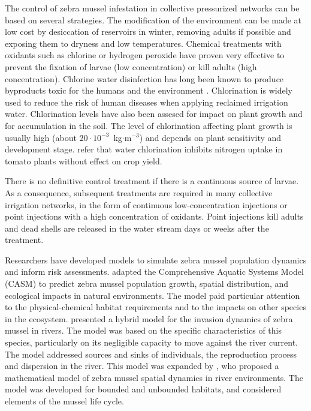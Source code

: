 \documentclass[review,authoryear]{elsarticle}
\begin{document}
The control of zebra mussel infestation in collective pressurized networks can
be based on several strategies. The modification of the environment can be made
at low cost by desiccation of reservoirs in winter, removing adults if possible
and exposing them to dryness and low temperatures. Chemical treatments with
oxidants such as chlorine or hydrogen peroxide have proven very effective to
prevent the fixation of larvae (low concentration) or kill adults (high
concentration). Chlorine water disinfection has long been known to produce
byproducts toxic for the humans and the environment \citep{Hanigan17}.
Chlorination is widely used to reduce the risk of human diseases when applying
reclaimed irrigation water. Chlorination levels have also been assesed for
impact on plant growth and for accumulation in the soil. The level of
chlorination affecting plant growth is usually high (about
$20\cdot10^{-3}$~kg$\cdot$m$^{-3}$) and depends on plant sensitivity and
development stage. \citet{LiLi09} refer that water chlorination inhibits
nitrogen uptake in tomato plants without effect on crop yield.

There is no definitive control treatment if there is a continuous source of
larvae. As a consequence, subsequent treatments are required in many collective
irrigation networks, in the form of continuous low-concentration injections or
point injections with a high concentration of oxidants. Point injections kill
adults and dead shells are released in the water stream days or weeks after the
treatment.

Researchers have developed models to simulate zebra mussel population dynamics
and inform risk assessments. \citet{Wu10} adapted the Comprehensive Aquatic
Systems Model (CASM) to predict zebra mussel population growth, spatial
distribution, and ecological impacts in natural environments. The model paid
particular attention to the physical-chemical habitat requirements and to the
impacts on other species in the ecosystem. \citet{Huang17} presented a hybrid
model for the invasion dynamics of zebra mussel in rivers. The model was based
on the specific characteristics of this species, particularly on its negligible
capacity to move against the river current. The model addressed sources and
sinks of individuals, the reproduction process and dispersion in the river. This
model was expanded by \citet{JinZhao21}, who proposed a mathematical model of
zebra mussel spatial dynamics in river environments. The model was developed for
bounded and unbounded habitats, and considered elements of the mussel life
cycle.
\end{document}
